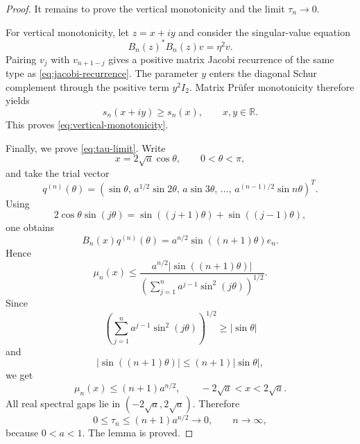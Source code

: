 \documentclass[11pt]{amsart}
\numberwithin{equation}{section}
\newcommand{\R}{\mathbb R}
\begin{document}
\begin{proof}
It remains to prove the vertical monotonicity and the limit \(\tau_n\to0\).

For vertical monotonicity, let \(z=x+iy\) and consider the singular-value equation
\begin{equation}\label{eq:singular-value-equation}
B_n(z)^*B_n(z)v=\eta^2v.
\end{equation}
Pairing \(v_j\) with \(v_{n+1-j}\) gives a positive matrix Jacobi recurrence of the same type as \eqref{eq:jacobi-recurrence}.  The parameter \(y\) enters the diagonal Schur complement through the positive term \(y^2I_2\).  Matrix Pr\"ufer monotonicity therefore yields
\begin{equation}\label{eq:vertical-monotonicity-proof}
s_n(x+iy)\ge s_n(x),
\qquad x,y\in\R.
\end{equation}
This proves \eqref{eq:vertical-monotonicity}.

Finally, we prove \eqref{eq:tau-limit}.  Write
\[
x=2\sqrt a\cos\theta,
\qquad 0<\theta<\pi,
\]
and take the trial vector
\begin{equation}\label{eq:trial-vector}
q^{(n)}(\theta)
=
\left(
\sin\theta,\,
a^{1/2}\sin2\theta,\,
a\sin3\theta,\,
\dots,\,
a^{(n-1)/2}\sin n\theta
\right)^T.
\end{equation}
Using
\begin{equation}\label{eq:trig-identity}
2\cos\theta\sin(j\theta)
=
\sin((j+1)\theta)+\sin((j-1)\theta),
\end{equation}
one obtains
\begin{equation}\label{eq:trial-residual}
B_n(x)q^{(n)}(\theta)
=
a^{n/2}\sin((n+1)\theta)e_n.
\end{equation}
Hence
\begin{equation}\label{eq:singular-bound}
\mu_n(x)
\le
\frac{
a^{n/2}|\sin((n+1)\theta)|
}{
\left(\sum_{j=1}^n a^{j-1}\sin^2(j\theta)\right)^{1/2}
}.
\end{equation}
Since
\begin{equation}\label{eq:denominator-bound}
\left(\sum_{j=1}^n a^{j-1}\sin^2(j\theta)\right)^{1/2}
\ge |\sin\theta|
\end{equation}
and
\begin{equation}\label{eq:sine-bound}
|\sin((n+1)\theta)|
\le
(n+1)|\sin\theta|,
\end{equation}
we get
\begin{equation}\label{eq:uniform-real-bound}
\mu_n(x)\le (n+1)a^{n/2},
\qquad -2\sqrt a<x<2\sqrt a.
\end{equation}
All real spectral gaps lie in \((-2\sqrt a,2\sqrt a)\).  Therefore
\begin{equation}\label{eq:tau-upper-limit}
0\le \tau_n\le (n+1)a^{n/2}\longrightarrow0,
\qquad n\to\infty,
\end{equation}
because \(0<a<1\).  The lemma is proved.
\end{proof}
\end{document}
